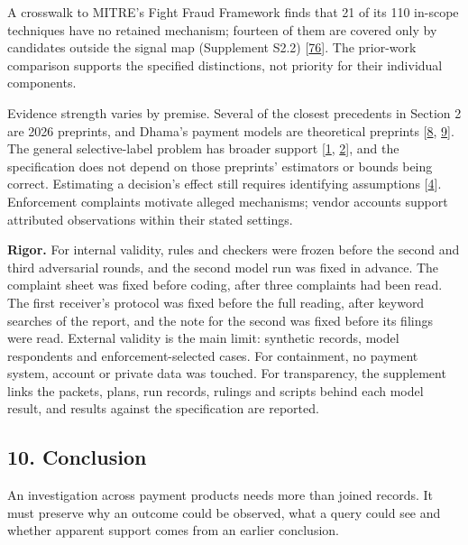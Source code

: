 \documentclass[
  11pt,
]{article}
\begin{document}
\begin{table}[tp]
{\begin{tabular}
\bottomrule\noalign{}
\end{tabular}
}
\end{table}

A crosswalk to MITRE's Fight Fraud Framework finds that 21 of its 110
in-scope techniques have no retained mechanism; fourteen of them are
covered only by candidates outside the signal map (Supplement S2.2)
{[}\protect\hyperlink{ref-MITRE2026F3}{76}{]}. The prior-work comparison
supports the specified distinctions, not priority for their individual
components.

Evidence strength varies by premise. Several of the closest precedents
in Section 2 are 2026 preprints, and Dhama's payment models are
theoretical preprints {[}\protect\hyperlink{ref-Dhama2026Causal}{8},
\protect\hyperlink{ref-Dhama2026Limits}{9}{]}. The general
selective-label problem has broader support
{[}\protect\hyperlink{ref-Lakkaraju2017Selective}{1},
\protect\hyperlink{ref-Kilbertus2020Fair}{2}{]}, and the specification
does not depend on those preprints' estimators or bounds being correct.
Estimating a decision's effect still requires identifying assumptions
{[}\protect\hyperlink{ref-HernanRobins2020}{4}{]}. Enforcement
complaints motivate alleged mechanisms; vendor accounts support
attributed observations within their stated settings.

\textbf{Rigor.} For internal validity, rules and checkers were frozen
before the second and third adversarial rounds, and the second model run
was fixed in advance. The complaint sheet was fixed before coding, after
three complaints had been read. The first receiver's protocol was fixed
before the full reading, after keyword searches of the report, and the
note for the second was fixed before its filings were read. External
validity is the main limit: synthetic records, model respondents and
enforcement-selected cases. For containment, no payment system, account
or private data was touched. For transparency, the supplement links the
packets, plans, run records, rulings and scripts behind each model
result, and results against the specification are reported.

\FloatBarrier

\hypertarget{conclusion}{%
\subsection{10. Conclusion}\label{conclusion}}

\suppressfloats[t]

An investigation across payment products needs more than joined records.
It must preserve why an outcome could be observed, what a query could
see and whether apparent support comes from an earlier conclusion.
\end{document}
